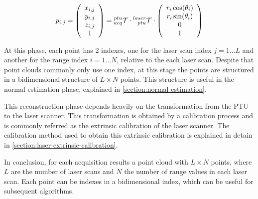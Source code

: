 \begin{equation}\label{eqn:point-registration}
    p_{i,j} = 
    \left(
        \begin{array}{c}
            x_{i,j} \\ y_{i,j} \\ z_{i,j} \\ 1 \\
        \end{array}    
    \right)
    =
    \TF{acq}{ptu}
    \cdot \TF{ptu}{laser}
    \cdot
    \left(
        \begin{array}{c}
            r_i \cos(\theta_i) \\
            r_i \sin(\theta_i) \\
            0 \\
            1 \\
        \end{array}    
    \right)
\end{equation}

At this phase, each point has 2 indexes, one for the laser scan index $j=1\dots L$ and another for the range index $i=1\dots N$, relative to the each laser scan. Despite that point clouds commonly only use one index, at this stage the points are structured in a bidimensional structure of $L \times N$ points. This structure is useful in the normal estimation phase, explained in \cref{section:normal-estimation}.

This reconstruction phase depends heavily on the transformation from the PTU to the laser scanner. This transformation is obtained by a calibration process and is commonly referred as the extrinsic calibration of the laser scanner. The calibration method used to obtain this extrinsic calibration is explained in detain in \cref{section:laser-extrinsic-calibration}.

In conclusion, for each acquisition results a point cloud with $L \times N$ points, where $L$ are the number of laser scans and $N$ the number of range values in each laser scan. Each point can be indexes in a bidimensional index, which can be useful for subsequent algorithms.

